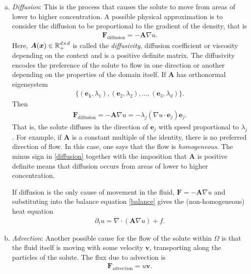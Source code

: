 \documentclass[
	a4paper,
	DIV=14,
	abstract=true,
	numbers=noenddot
]
{scrartcl}
\theoremstyle{definition}
\begin{document}
\begin{enumerate}[a)]
	\item \emph{Diffusion}: This is the process that causes the solute to move from areas of lower to higher concentration. A possible physical approximation is to consider the diffusion to be proportional to the gradient of the density, that is
	      \begin{align*}
		      \bm{F}_{\text{diffusion}} = -\bm{A}\nabla u  .
	      \end{align*}
	      Here, $\bm{A}(\bm{x} ) \in \mathbb{R}^{d\times d}_+$ is called the \emph{diffusivity}, diffusion coefficient or viscosity depending on the context and is a positive definite matrix. The diffusivity encodes the preference of the solute to flow in one direction or another depending on the properties of the domain itself. If $\bm{A}$ has orthonormal eigensystem
	      \begin{align*}
		      \{(\bm{e_1},\lambda _1 ),(\bm{e}_2, \lambda _2 ),\ldots, (\bm{e}_3 ,\lambda _d)\} .
	      \end{align*}
	      Then
	      \begin{align}\label{diffusion}
		      \bm{F}_{\text{diffusion}} = -\bm{A}\nabla u=-  \lambda _j(\nabla u\cdot \bm{e}_j )\bm{e}_j .
	      \end{align}
	      That is, the solute diffuses in the direction of $\bm{e}_j $ with speed proportional to $\lambda_j$. For example, if $\bm{A} $ is a constant multiple of the identity, there is no preferred direction of flow. In this case, one says that the flow is \emph{homogeneous}. The minus sign in \eqref{diffusion} together with the imposition that $\bm{A} $ is positive definite means that diffusion occurs from areas of lower to higher concentration.

	      If diffusion is the only cause of movement in the fluid, $\bm{F}= - \bm{A}\nabla u $ and substituting  into the balance equation \eqref{balance} gives the (non-homogeneous) heat equation
	      \begin{align*}
		      \partial_tu= \nabla \cdot (\bm{A}\nabla u)+f .
	      \end{align*}
	\item \emph{Advection}: Another possible cause for the flow of the solute within $\Omega$ is that the fluid itself is moving with some velocity  $\bm{v}$, transporting along the particles of the solute. The flux due to advection is
	      \begin{align*}
		      \bm{F}_{\text{advection} }= u \bm{v} .
	      \end{align*}
\end{enumerate}
\end{document}

